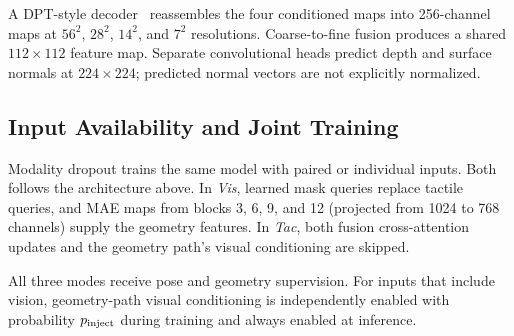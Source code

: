 \documentclass[letterpaper,10pt,conference]{ieeeconf}
\begin{document}
A DPT-style decoder~\cite{ranftl2021dpt} reassembles the four conditioned maps into 256-channel maps at $56^2$, $28^2$, $14^2$, and $7^2$ resolutions. Coarse-to-fine fusion produces a shared $112\times112$ feature map. Separate convolutional heads predict depth and surface normals at $224\times224$; predicted normal vectors are not explicitly normalized.





\subsection{Input Availability and Joint Training}
\label{sec:three_configs}
Modality dropout trains the same model with paired or individual inputs.
Both follows the architecture above. In \emph{Vis}, learned mask queries replace tactile queries, and MAE maps from blocks 3, 6, 9, and 12 (projected from 1024 to 768 channels) supply the geometry features. In \emph{Tac}, both fusion cross-attention updates and the geometry path's visual conditioning are skipped.

All three modes receive pose and geometry supervision.
For inputs that include vision, geometry-path visual conditioning is independently enabled with probability $p_{\rm inject}$ during training and always enabled at inference.


\end{document}
